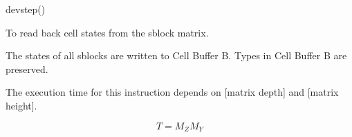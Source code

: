 

\format

devstep()

\purpose

To read back cell states from the sblock matrix.

\description

The states of all sblocks are written to Cell Buffer B.
Types in Cell Buffer B are preserved.

\notes

The execution time for this instruction depends on [matrix depth] and [matrix height].

$$ T = M_Z M_Y $$
